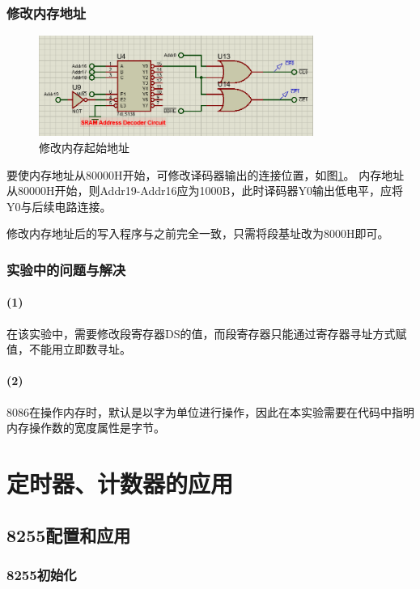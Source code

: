 \documentclass[12pt, a4paper, oneside]{ctexart}
\begin{document}
    \subsubsection{修改内存地址}
    \begin{figure}[!h]
        \centering
        \includegraphics[width=0.8\textwidth]{img/newmemoryaddr.png}
        \caption{修改内存起始地址}
        \label{fig:newmemoryaddr}
    \end{figure}
    要使内存地址从80000H开始，可修改译码器输出的连接位置，如图\ref{fig:newmemoryaddr}。
    内存地址从80000H开始，则Addr19-Addr16应为1000B，此时译码器Y0输出低电平，应将Y0与后续电路连接。

    修改内存地址后的写入程序与之前完全一致，只需将段基址改为8000H即可。
    \subsubsection{实验中的问题与解决}
    \paragraph{(1)} 在该实验中，需要修改段寄存器DS的值，而段寄存器只能通过寄存器寻址方式赋值，不能用立即数寻址。
    \paragraph{(2)} 8086在操作内存时，默认是以字为单位进行操作，因此在本实验需要在代码中指明内存操作数的宽度属性是字节。
    \section{定时器、计数器的应用}
    \subsection{8255配置和应用}
    \subsubsection{8255初始化}
\end{document}

